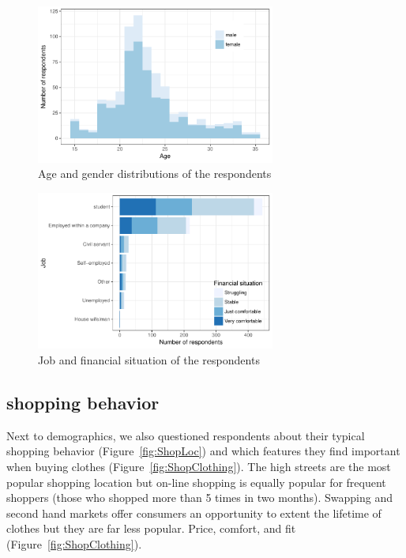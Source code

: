 \documentclass[review]{elsarticle}
\begin{document}
\begin{figure}[ht]
\begin{center}
 \includegraphics[width=0.7\textwidth]{figures/DemAgeGender.pdf}
 \caption{Age and gender distributions of the respondents}\label{fig:DemAgeGender}
 \end{center}
\end{figure}
\begin{figure}[ht]
\begin{center}
 \includegraphics[width=0.7\textwidth]{figures/DemJobIncome.pdf}
 \caption{Job and financial situation of the respondents}\label{fig:JobIncome}
 \end{center}
\end{figure}

\subsection{shopping behavior}
Next to demographics, we also questioned respondents about their typical shopping behavior (Figure~\ref{fig:ShopLoc}) and which features they find important when buying clothes (Figure~\ref{fig:ShopClothing}). The high streets are the most popular shopping location but on-line shopping is equally popular for frequent shoppers (those who shopped more than 5 times in two months). Swapping and second hand markets offer consumers an opportunity to extent the lifetime of clothes but they are far less popular. Price, comfort, and fit (Figure~\ref{fig:ShopClothing}). 
\end{document}
